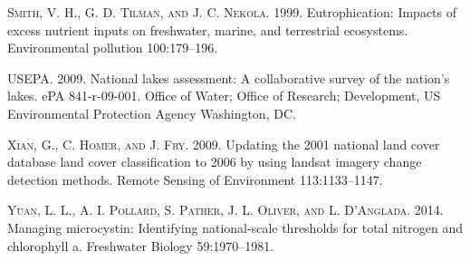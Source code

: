 \documentclass[11pt,]{article}
\begin{document}
\textsc{Smith, V. H., G. D. Tilman, and J. C. Nekola}. 1999.
Eutrophication: Impacts of excess nutrient inputs on freshwater, marine,
and terrestrial ecosystems. Environmental pollution 100:179--196.

\textsc{USEPA}. 2009. National lakes assessment: A collaborative survey
of the nation's lakes. ePA 841-r-09-001. Office of Water; Office of
Research; Development, US Environmental Protection Agency Washington,
DC.

\textsc{Xian, G., C. Homer, and J. Fry}. 2009. Updating the 2001
national land cover database land cover classification to 2006 by using
landsat imagery change detection methods. Remote Sensing of Environment
113:1133--1147.

\textsc{Yuan, L. L., A. I. Pollard, S. Pather, J. L. Oliver, and L.
D'Anglada}. 2014. Managing microcystin: Identifying national-scale
thresholds for total nitrogen and chlorophyll a. Freshwater Biology
59:1970--1981.
\end{document}
